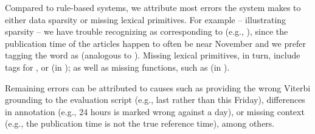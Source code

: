 Compared to rule-based systems, we attribute most errors the system makes
	to either data sparsity or missing lexical primitives.
For example -- illustrating sparsity -- we have trouble recognizing  as corresponding
	to  (e.g., ), since the publication time of the articles happen to
	often be near November and we prefer tagging the word as  (analogous to 
	).
Missing lexical primitives, in turn, include tags for , or 
	(in ); as well as missing functions, such as
	 (in ).

Remaining errors can be attributed to causes such as providing the wrong Viterbi grounding
	to the evaluation script (e.g., last rather than this Friday), differences in 
	annotation (e.g., 24 hours is marked wrong against a day), or missing context 
	(e.g., the publication time is not the true reference time), among others.
